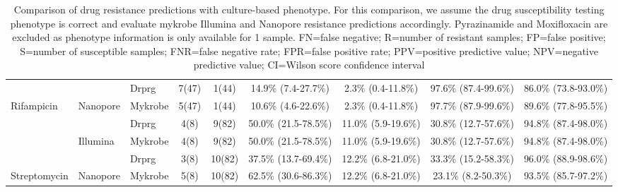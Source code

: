 \begin{table}
{\begin{tabular}{|l|l|l|c|c|c|c|c|c|}
                               &                            & \cellcolor[HTML]{EFEFEF}Drprg & \cellcolor[HTML]{EFEFEF}7(47) & \cellcolor[HTML]{EFEFEF}1(44)  & \cellcolor[HTML]{EFEFEF}14.9\% (7.4-27.7\%)  & \cellcolor[HTML]{EFEFEF}2.3\% (0.4-11.8\%)   & \cellcolor[HTML]{EFEFEF}97.6\% (87.4-99.6\%) & \cellcolor[HTML]{EFEFEF}86.0\% (73.8-93.0\%)   \\ \cline{3-9} 
\multirow{-4}{*}{Rifampicin}   & \multirow{-2}{*}{Nanopore} & Mykrobe                       & 5(47)                         & 1(44)                          & 10.6\% (4.6-22.6\%)                          & 2.3\% (0.4-11.8\%)                           & 97.7\% (87.9-99.6\%)                         & 89.6\% (77.8-95.5\%)                           \\ \hline
                               &                            & \cellcolor[HTML]{EFEFEF}Drprg & \cellcolor[HTML]{EFEFEF}4(8)  & \cellcolor[HTML]{EFEFEF}9(82)  & \cellcolor[HTML]{EFEFEF}50.0\% (21.5-78.5\%) & \cellcolor[HTML]{EFEFEF}11.0\% (5.9-19.6\%)  & \cellcolor[HTML]{EFEFEF}30.8\% (12.7-57.6\%) & \cellcolor[HTML]{EFEFEF}94.8\% (87.4-98.0\%)   \\ \cline{3-9} 
                               & \multirow{-2}{*}{Illumina} & Mykrobe                       & 4(8)                          & 9(82)                          & 50.0\% (21.5-78.5\%)                         & 11.0\% (5.9-19.6\%)                          & 30.8\% (12.7-57.6\%)                         & 94.8\% (87.4-98.0\%)                           \\ \cline{2-9} 
                               &                            & \cellcolor[HTML]{EFEFEF}Drprg & \cellcolor[HTML]{EFEFEF}3(8)  & \cellcolor[HTML]{EFEFEF}10(82) & \cellcolor[HTML]{EFEFEF}37.5\% (13.7-69.4\%) & \cellcolor[HTML]{EFEFEF}12.2\% (6.8-21.0\%)  & \cellcolor[HTML]{EFEFEF}33.3\% (15.2-58.3\%) & \cellcolor[HTML]{EFEFEF}96.0\% (88.9-98.6\%)   \\ \cline{3-9} 
\multirow{-4}{*}{Streptomycin} & \multirow{-2}{*}{Nanopore} & Mykrobe                       & 5(8)                          & 10(82)                         & 62.5\% (30.6-86.3\%)                         & 12.2\% (6.8-21.0\%)                          & 23.1\% (8.2-50.3\%)                          & 93.5\% (85.7-97.2\%)                           \\ \cline{3-9} 
\end{tabular}%
}
\caption{Comparison of drug resistance predictions with culture-based phenotype.
For this comparison, we assume the drug susceptibility testing phenotype is correct and evaluate mykrobe Illumina and Nanopore resistance predictions accordingly. Pyrazinamide and Moxifloxacin are excluded as phenotype information is only available for 1 sample.
FN=false negative; R=number of resistant samples; FP=false positive; S=number of susceptible samples; FNR=false negative rate; FPR=false positive rate; PPV=positive predictive value; NPV=negative predictive value; CI=Wilson score confidence interval}
\label{tab:pheno-concordance}
\end{table}
